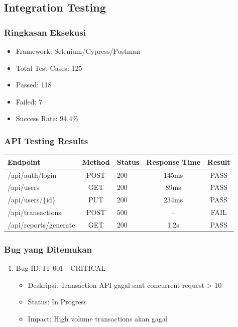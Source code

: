 \documentclass[12pt,a4paper]{article}
\begin{document}
\subsection{Integration Testing}
\subsubsection{Ringkasan Eksekusi}
\begin{itemize}
  \item Framework: Selenium/Cypress/Postman
  \item Total Test Cases: 125
  \item Passed: 118
  \item Failed: 7
  \item Success Rate: 94.4\%
\end{itemize}

\subsubsection{API Testing Results}
\begin{tabularx}{\textwidth}{@{}lclcc@{}}
\toprule
Endpoint & Method & Status & Response Time & Result \\
\midrule
/api/auth/login & POST & 200 & 145ms & PASS \\
/api/users & GET & 200 & 89ms & PASS \\
/api/users/\{id\} & PUT & 200 & 234ms & PASS \\
/api/transactions & POST & 500 & -- & FAIL \\
/api/reports/generate & GET & 200 & 1.2s & PASS \\
\bottomrule
\end{tabularx}

\subsubsection{Bug yang Ditemukan}
\begin{enumerate}
  \item Bug ID: IT-001 - CRITICAL
  \begin{itemize}
    \item Deskripsi: Transaction API gagal saat concurrent request > 10
    \item Status: In Progress
    \item Impact: High volume transactions akan gagal
  \end{itemize}
\end{enumerate}
\end{document}
